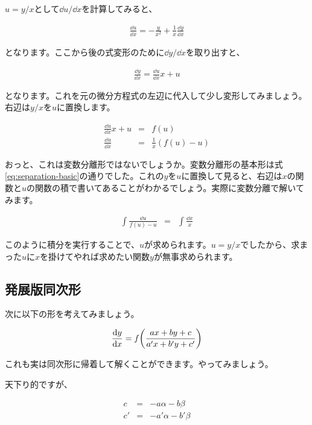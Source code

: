\noindent
$u=y/x$として$\dd u/\dd x$を計算してみると、

\begin{eqnarray}
    \frac{\dd u}{\dd x}=-\frac{y}{x^2}+\frac{1}{x}\frac{\dd y}{\dd x}
\end{eqnarray}

\noindent
となります。ここから後の式変形のために$\dd y/\dd x$を取り出すと、

\begin{eqnarray}
    \frac{\dd y}{\dd x}=\frac{\dd u}{\dd x}x+u
\end{eqnarray}

\noindent
となります。これを元の微分方程式の左辺に代入して少し変形してみましょう。右辺は$y/x$を$u$に置換します。

\begin{eqnarray}
    \frac{\dd u}{\dd x}x+u&=&f(u) \\
    \frac{\dd u}{\dd x}&=&\frac{1}{x}(f(u)-u)
\end{eqnarray}

\noindent
おっと、これは変数分離形ではないでしょうか。変数分離形の基本形は式\ref{eq:separation-basic}の通りでした。これの$y$を$u$に置換して見ると、右辺は$x$の関数と$u$の関数の積で書いてあることがわかるでしょう。実際に変数分離で解いてみます。

\begin{eqnarray}
    \int \frac{\dd u}{f(u)-u}&=&\int\frac{\dd x}{x}
\end{eqnarray}

このように積分を実行することで、$u$が求められます。$u=y/x$でしたから、求まった$u$に$x$を掛けてやれば求めたい関数$y$が無事求められます。







\subsection{発展版同次形}
\label{advanced-homogeneous}

次に以下の形を考えてみましょう。

\begin{eqnarray}
    \frac{\dd y}{\dd x}=f\pqty{\frac{ax+by+c}{a'x+b'y+c'}}
\end{eqnarray}

\noindent
これも実は同次形に帰着して解くことができます。やってみましょう。

天下り的ですが、

\begin{eqnarray}
    c&=&-a\alpha-b\beta \\
    c'&=&-a'\alpha-b'\beta
\end{eqnarray}

